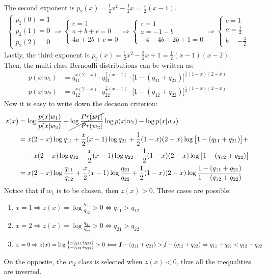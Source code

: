 The second exponent is \(p_2(x)=\frac{1}{2}x^2-\frac{1}{2}x=\frac{x}{2}(x-1)\).
\begin{align*}
    \begin{cases}
        p_2(0)=1\\p_2(1)=0\\p_2(2)=0
    \end{cases}
    \Rightarrow
    \begin{cases}
        c=1\\a+b+c=0\\4a+2b+c=0
    \end{cases}
    \Rightarrow
    \begin{cases}
        c=1\\a=-1-b\\-4-4b+2b+1=0
    \end{cases}
    \Rightarrow
    \begin{cases}
        c=1\\a=\frac{1}{2}\\b=-\frac{3}{2}
    \end{cases}
\end{align*}
Lastly, the third exponent is \(p_2(x)=\frac{1}{2}x^2-\frac{3}{2}x+1=\frac{1}{2}(x-1)(x-2)\).\\
Then, the multi-class Bernoulli distributions can be written as:
\begin{align*}
    p(x|w_1)
    &=q_{11}^{x(2-x)}\cdot q_{21}^{\frac{x}{2}(x-1)}\cdot\bigl[1-(q_{11}+q_{21})\bigr]^{\frac{1}{2}(1-x)(2-x)}\\
    p(x|w_2)
    &=q_{12}^{x(2-x)}\cdot q_{22}^{\frac{x}{2}(x-1)}\cdot\bigl[1-(q_{12}+q_{22})\bigr]^{\frac{1}{2}(1-x)(2-x)}
\end{align*}
Now it is easy to write down the decision criterion:
\begin{align*}
    z(x)
    &=\log{\frac{p(x|w_1)}{p(x|w_2)}}+\cancel{\log{\frac{Pr(w_1)}{Pr(w_2)}}}
    \log{p(x|w_1)}-\log{p(x|w_2)}\\
    &=x(2-x)\log{q_{11}}+\frac{x}{2}(x-1)\log{q_{21}}+\frac{1}{2}(1-x)(2-x)\log{\bigl[1-(q_{11}+q_{21})\bigr]}+\\
    &\quad-x(2-x)\log{q_{12}}-\frac{x}{2}(x-1)\log{q_{22}}-\frac{1}{2}(1-x)(2-x)\log{\bigl[1-(q_{12}+q_{22})\bigr]}\\
    &=x(2-x)\log{\frac{q_{11}}{q_{12}}}+\frac{x}{2}(x-1)\log{\frac{q_{21}}{q_{22}}}+\frac{1}{2}(1-x)(2-x)\log{\frac{1-(q_{11}+q_{21})}{1-(q_{12}+q_{22})}}
\end{align*}
Notice that if \(w_1\) is to be chosen, then \(z(x)>0\). Three cases
are possible:
\begin{enumerate}
    \item\quad \(x=1\Rightarrow z(x)=\log{\frac{q_{11}}{q_{12}}}>0\Longleftrightarrow q_{11}>q_{12}\)
    \item\quad \(x=2\Rightarrow z(x)=\log{\frac{q_{21}}{q_{22}}}>0\Longleftrightarrow q_{21}>q_{22}\)
    \item\quad \(x=0\Rightarrow z(x)=\log{\frac{1-(q_{11}+q_{21})}{1-(q_{12}+q_{22})}}>0\Longleftrightarrow \cancel{1}-(q_{11}+q_{21})>\cancel{1}-(q_{12}+q_{22})\Rightarrow q_{11}+q_{21}<q_{12}+q_{22}\)
\end{enumerate}
On the opposite, the \(w_2\) class is selected when \(z(x)<0\), thus
all the inequalities are inverted.